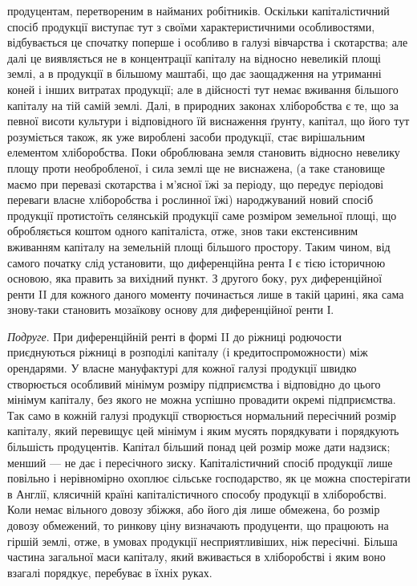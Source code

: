 \parcont{}  %
продуцентам, перетвореним в найманих робітників. Оскільки капіталістичний
спосіб продукції виступає тут з своїми характеристичними особливостями,
відбувається це спочатку поперше і особливо в галузі вівчарства і скотарства;
але далі це виявляється не в концентрації капіталу на відносно невеликій
площі землі, а в продукції в більшому маштабі, що дає заощадження на
утриманні коней і інших витратах продукції; але в дійсності тут немає вживання
більшого капіталу на тій самій землі. Далі, в природних законах хліборобства
є те, що за певної висоти культури і відповідного їй виснаження
ґрунту, капітал, що його тут розуміється також, як уже вироблені засоби
продукції, стає вирішальним елементом хліборобства. Поки оброблювана
земля становить відносно невелику площу проти необробленої, і сила землі ще
не виснажена, (а таке становище маємо при перевазі скотарства і м’ясної їжі
за періоду, що передує періодові переваги власне хліборобства і рослинної їжі)
народжуваний новий спосіб продукції протистоїть селянській продукції саме розміром
земельної площі, що обробляється коштом одного капіталіста, отже, знов таки
екстенсивним вживанням капіталу на земельній площі більшого простору. Таким
чином, від самого початку слід установити, що диференційна рента І є тією
історичною основою, яка править за вихідний пункт. З другого боку, рух диференційної
ренти II для кожного даного моменту починається лише в такій царині,
яка сама знову-таки становить мозаїкову основу для диференційної ренти І.

\emph{Подруге}. При диференційній ренті в формі II до ріжниці родючости приєднуються
ріжниці в розподілі капіталу (і кредитоспроможности) між орендарями.
У власне мануфактурі для кожної галузі продукції швидко створюється особливий
мінімум розміру підприємства і відповідно до цього мінімум капіталу,
без якого не можна успішно провадити окремі підприємства. Так само в кожній
галузі продукції створюється нормальний пересічний розмір капіталу, який
перевищує цей мінімум і яким мусять порядкувати і порядкують більшість продуцентів.
Капітал більший понад цей розмір може дати надзиск; менший — не
дає і пересічного зиску. Капіталістичний спосіб продукції лише повільно і нерівномірно
охоплює сільське господарство, як це можна спостерігати в Англії,
клясичній країні капіталістичного способу продукції в хліборобстві. Коли немає
вільного довозу збіжжя, або його дія лише обмежена, бо розмір довозу обмежений,
то ринкову ціну визначають продуценти, що працюють на гіршій землі,
отже, в умовах продукції несприятливіших, ніж пересічні. Більша частина загальної
маси капіталу, який вживається в хліборобстві і яким воно взагалі
порядкує, перебуває в їхніх руках.

